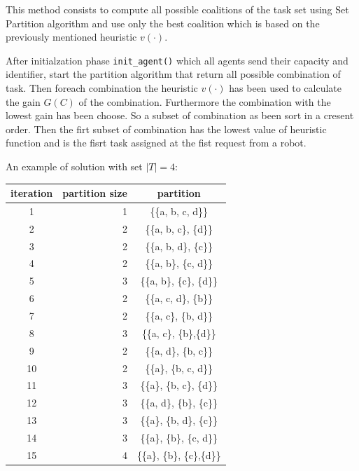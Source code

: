 This method consists to compute all possible coalitions of the task set 
using Set Partition algorithm \cite{partition} and use only 
the best coalition which is based on the previously mentioned heuristic $v(\cdot)$.

After initialzation phase \texttt{init\_agent()} which all agents send their capacity and identifier,
start the partition algorithm \cite{partition} that return all possible combination 
of task.
Then foreach combination the heuristic $v(\cdot)$ has been used to calculate the gain $G(C)$ of the 
combination. Furthermore the combination with the lowest gain has been choose.
So a subset of combination as been sort in a cresent order. 
Then the firt subset of combination has the lowest value of heuristic function and 
is the fisrt task assigned at the fist request from a robot.

An example of solution with set $|T| = 4$:
\begin{center}
  \begin{tabular}{|c|r|c|} \hline
  \textbf{iteration} & \textbf{partition size} & \textbf{partition} \\ \hline
  1    & 1    & \{\{a, b, c, d\}\}   \\
  2    & 2    & \{\{a, b, c\}, \{d\}\}   \\
  3    & 2    & \{\{a, b, d\}, \{c\}\}   \\
  4    & 2    & \{\{a, b\}, \{c, d\}\}   \\
  5    & 3    & \{\{a, b\}, \{c\}, \{d\}\}   \\
  6    & 2    & \{\{a, c, d\}, \{b\}\}   \\
  7    & 2    & \{\{a, c\}, \{b, d\}\}   \\
  8    & 3    & \{\{a, c\}, \{b\},\{d\}\}   \\
  9    & 2    & \{\{a, d\}, \{b, c\}\}   \\
  10   & 2    & \{\{a\}, \{b, c, d\}\}   \\
  11   & 3    & \{\{a\}, \{b, c\}, \{d\}\}   \\
  12   & 3    & \{\{a, d\}, \{b\}, \{c\}\}   \\
  13   & 3    & \{\{a\}, \{b, d\}, \{c\}\}   \\
  14   & 3    & \{\{a\}, \{b\}, \{c, d\}\}   \\
  15   & 4    & \{\{a\}, \{b\}, \{c\},\{d\}\}   \\ \hline       
  \end{tabular}
\end{center}

